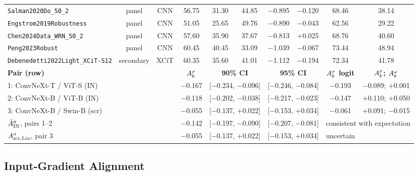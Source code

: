\begin{table}[!t]
\begin{tabular*}{\textwidth}{@{\extracolsep{\fill}}lccccccccc}
\texttt{Salman2020Do\_50\_2} & panel & CNN & 56.75 & 31.30 & 44.85 & $-$0.895 & $-$0.120 & 68.46 & 38.14 \\
\texttt{Engstrom2019Robustness} & panel & CNN & 51.05 & 25.65 & 49.76 & $-$0.890 & $-$0.043 & 62.56 & 29.22 \\
\texttt{Chen2024Data\_WRN\_50\_2} & panel & CNN & 57.60 & 35.90 & 37.67 & $-$0.813 & $+$0.025 & 68.76 & 40.60 \\
\texttt{Peng2023Robust} & panel & CNN & 60.45 & 40.45 & 33.09 & $-$1.039 & $-$0.067 & 73.44 & 48.94 \\
\texttt{Debenedetti2022Light\_XCiT-S12} & secondary & XCiT & 60.35 & 35.60 & 41.01 & $-$1.112 & $-$0.194 & 72.34 & 41.78 \\
\midrule
\multicolumn{3}{l}{\textbf{Pair (row)}} & \textbf{$A^{\sigma}_{k}$} & \multicolumn{2}{c}{\textbf{90\% CI}} & \multicolumn{2}{c}{\textbf{95\% CI}} & \textbf{$A^{\sigma}_{k}$ logit} & \textbf{$A^{\rho}_{k}$; $A^{\omega}_{k}$} \\
\midrule
\multicolumn{3}{l}{1: ConvNeXt-T / ViT-S (IN)} & $-$0.167 & \multicolumn{2}{c}{[$-$0.234, $-$0.096]} & \multicolumn{2}{c}{[$-$0.246, $-$0.084]} & $-$0.193 & $-$0.089; $+$0.001 \\
\multicolumn{3}{l}{2: ConvNeXt-B / ViT-B (IN)} & $-$0.118 & \multicolumn{2}{c}{[$-$0.202, $-$0.038]} & \multicolumn{2}{c}{[$-$0.217, $-$0.023]} & $-$0.147 & $+$0.110; $+$0.050 \\
\multicolumn{3}{l}{3: ConvNeXt-B / Swin-B (scr)} & $-$0.055 & \multicolumn{2}{c}{[$-$0.137, $+$0.022]} & \multicolumn{2}{c}{[$-$0.153, $+$0.034]} & $-$0.061 & $+$0.091; $-$0.015 \\
\multicolumn{3}{l}{$\bar{A}^{\sigma}_{\mathrm{IN}}$, pairs 1--2} & $-$0.142 & \multicolumn{2}{c}{[$-$0.197, $-$0.090]} & \multicolumn{2}{c}{[$-$0.207, $-$0.081]} & \multicolumn{2}{l}{consistent with expectation} \\
\multicolumn{3}{l}{$A^{\sigma}_{\mathrm{scr,Liu}}$, pair 3} & $-$0.055 & \multicolumn{2}{c}{[$-$0.137, $+$0.022]} & \multicolumn{2}{c}{[$-$0.153, $+$0.034]} & \multicolumn{2}{l}{uncertain} \\
\bottomrule
\end{tabular*}
\end{table}

\subsection{Input-Gradient Alignment}
\label{subsec:gradcos}

